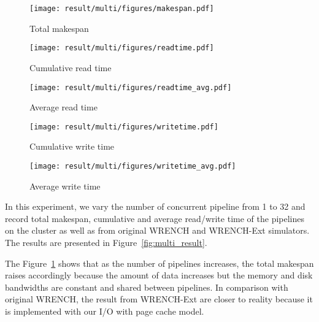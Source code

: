 \documentclass[conference]{IEEEtran}
\begin{document}
			\begin{figure*}
			\begin{subfigure}{\linewidth}
				\centering
   				\texttt{[image: result/multi/figures/makespan.pdf]}
   				\caption{Total makespan}	
   				\label{fig:multi_makespan}
			\end{subfigure}	
			\begin{subfigure}{\columnwidth}
				\centering
   				\texttt{[image: result/multi/figures/readtime.pdf]}
   				\caption{Cumulative read time}	
   				\label{fig:multi_readtime}
			\end{subfigure}	
			\begin{subfigure}{\columnwidth}
				\centering
   				\texttt{[image: result/multi/figures/readtime\_avg.pdf]}
   				\caption{Average read time}	
   				\label{fig:multi_readtime_avg}
			\end{subfigure}	
			\begin{subfigure}{\columnwidth}
				\centering
   				\texttt{[image: result/multi/figures/writetime.pdf]}
   				\caption{Cumulative write time}	
   				\label{fig:multi_writetime}
			\end{subfigure}	
			\begin{subfigure}{\columnwidth}
				\centering
   				\texttt{[image: result/multi/figures/writetime\_avg.pdf]}
   				\caption{Average write time}	
   				\label{fig:multi_writetime_avg}
			\end{subfigure}	
			\caption{Total makespan and I/O time with different number of concurrent pipeline}
			\label{fig:multi_result}
			\end{figure*}		
			
			In this experiment, we vary the number of 	concurrent pipeline from 1 to 32 
			and record total makespan, cumulative and average read/write time 
			of the pipelines on the cluster as well as from original WRENCH and 
			WRENCH-Ext simulators. 
			The results are presented in Figure~\ref{fig:multi_result}.
			
			The Figure~\ref{fig:multi_makespan} shows that as the number of pipelines 
			increases, the total makespan raises accordingly because the amount of data 
			increases but the memory and disk bandwidths are constant and shared between 
			pipelines. 
			In comparison with original WRENCH, the result from WRENCH-Ext are closer to 
			reality because it is implemented with our I/O with page cache model. 
			
\end{document}
